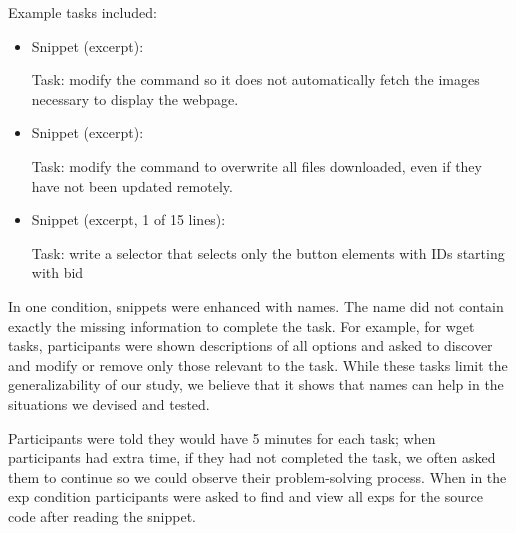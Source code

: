 \begin{changes}

Example tasks included:
\begin{itemize}

\item
Snippet (excerpt):


Task: modify the command so it does not automatically fetch the images necessary to display the webpage.

\item
Snippet (excerpt):


Task: modify the command to overwrite all files downloaded, even if they have not been updated remotely.

\item

Snippet (excerpt, 1 of 15 lines):


Task: write a selector that selects only the button elements with IDs starting with bid

\end{itemize}

In one condition, snippets were enhanced with \Glspl{name}.
The \gls{name} did not contain exactly the missing information to complete the task.
For example, for wget tasks, participants were shown descriptions of all options and asked to discover and modify or remove only those relevant to the task.
While these tasks limit the generalizability of our study, we believe that it shows that \Glspl{name} can help in the situations we devised and tested.
\end{changes}

Participants were told they would have 5 minutes for each task; when participants had extra time, if  they had not completed the task, we often asked them to continue so we could observe their problem-solving process. When in the \gls{exp} condition participants were asked to find and view all \glspl{exp} for the source code after reading the snippet.

